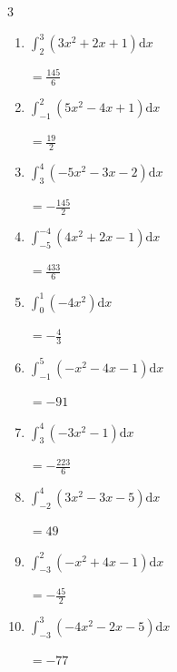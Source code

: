\begin{multicols}{3}
\begin{enumerate}
        $\displaystyle =\frac{155}{3}$

\columnbreak %

\resetques

  \item $\displaystyle \int_{2}^{3}\left( 3x^{2}+2x+1 \right) \mathrm{d}x$

        $\displaystyle =\frac{145}{6}$

  \item $\displaystyle \int_{-1}^{2}\left( 5x^{2}-4x+1 \right) \mathrm{d}x$

        $\displaystyle =\frac{19}{2}$

  \item $\displaystyle \int_{3}^{4}\left( -5x^{2}-3x-2 \right) \mathrm{d}x$

        $\displaystyle =-\frac{145}{2}$

  \item $\displaystyle \int_{-5}^{-4}\left( 4x^{2}+2x-1 \right) \mathrm{d}x$

        $\displaystyle =\frac{433}{6}$

  \item $\displaystyle \int_{0}^{1}\left( -4x^{2} \right) \mathrm{d}x$

        $\displaystyle =-\frac{4}{3}$

\columnbreak %

  \item $\displaystyle \int_{-1}^{5}\left( -x^{2}-4x-1 \right) \mathrm{d}x$

        $\displaystyle =-91$

  \item $\displaystyle \int_{3}^{4}\left( -3x^{2}-1 \right) \mathrm{d}x$

        $\displaystyle =-\frac{223}{6}$

  \item $\displaystyle \int_{-2}^{4}\left( 3x^{2}-3x-5 \right) \mathrm{d}x$

        $\displaystyle =49$

  \item $\displaystyle \int_{-3}^{2}\left( -x^{2}+4x-1 \right) \mathrm{d}x$

        $\displaystyle =-\frac{45}{2}$

  \item $\displaystyle \int_{-3}^{3}\left( -4x^{2}-2x-5 \right) \mathrm{d}x$

        $\displaystyle =-77$

\columnbreak %


\end{enumerate}
\end{multicols}
